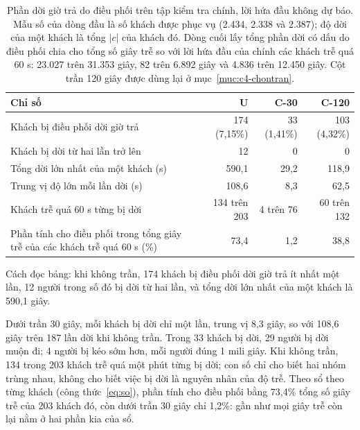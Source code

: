 \begin{table}[htbp]
\centering
\caption{Phần dời giờ trả do điều phối trên tập kiểm tra chính, lời hứa đầu không dự báo. Mẫu số của
dòng đầu là số khách được phục vụ (2.434, 2.338 và 2.387); độ dời của một khách là tổng $|c|$ của khách
đó. Dòng cuối lấy tổng phần dời có dấu do điều phối chia cho tổng số giây trễ so với lời hứa đầu của chính các khách
trễ quá 60 s: 23.027 trên 31.353 giây, 82 trên 6.892 giây và 4.836 trên 12.450 giây. Cột trần 120 giây được dùng
lại ở mục~\ref{muc:c4-chontran}.}
\label{bang:c4-doidieuphoi}
\small
\begin{tabular}{@{}p{7.6cm}rrr@{}}
\toprule
\textbf{Chỉ số} & \textbf{U} & \textbf{C-30} & \textbf{C-120}\\
\midrule
Khách bị điều phối dời giờ trả & 174 (7,15\%) & 33 (1,41\%) & 103 (4,32\%)\\
Khách bị dời từ hai lần trở lên & 12 & 0 & 0\\
Tổng dời lớn nhất của một khách (s) & 590,1 & 29,2 & 118,9\\
Trung vị độ lớn mỗi lần dời (s) & 108,6 & 8,3 & 62,5\\
Khách trễ quá 60 s từng bị dời & 134 trên 203 & 4 trên 76 & 60 trên 132\\
Phần tính cho điều phối trong tổng giây trễ của các khách trễ quá 60 s (\%) & 73,4 & 1,2 & 38,8\\
\bottomrule
\end{tabular}
\end{table}

Cách đọc bảng: khi không trần, 174 khách bị điều phối dời giờ trả ít nhất một lần, 12 người trong số đó bị dời từ hai
lần, và tổng dời lớn nhất của một khách là 590,1 giây.

Dưới trần 30 giây, mỗi khách bị dời chỉ một lần, trung vị 8,3 giây, so với 108,6 giây trên 187 lần dời khi không trần.
Trong 33 khách bị dời, 29 người bị dời muộn đi; 4 người bị kéo sớm hơn, mỗi người đúng 1 mili giây. Khi không trần,
134 trong 203 khách trễ quá một phút từng bị dời; con số chỉ cho biết hai nhóm trùng nhau, không cho biết việc bị dời
là nguyên nhân của độ trễ. Theo sổ theo từng khách (công thức~\eqref{eq:so}), phần tính cho điều phối bằng 73,4\% tổng
số giây trễ của 203 khách đó, còn dưới trần 30 giây chỉ 1,2\%: gần như mọi giây trễ còn lại nằm ở hai phần kia của sổ.

